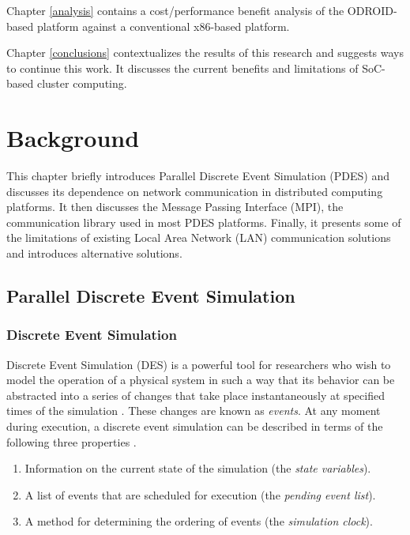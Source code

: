 \documentclass[11pt]{book}
\begin{document}
Chapter \ref{analysis} contains a cost/performance benefit analysis of the ODROID-based
platform against a conventional x86-based platform.  

Chapter \ref{conclusions} contextualizes the results of this research and suggests ways to
continue this work. It discusses the current benefits and limitations of SoC-based cluster
computing.

\chapter{Background}\label{background}

This chapter briefly introduces Parallel Discrete Event Simulation (PDES) and discusses
its dependence on network communication in distributed computing platforms.  It then
discusses the Message Passing Interface (MPI), the communication library used in most PDES
platforms.  Finally, it presents some of the limitations of existing Local Area Network
(LAN) communication solutions and introduces alternative solutions.

\section{Parallel Discrete Event Simulation}

\subsection{Discrete Event Simulation}

Discrete Event Simulation (DES) is a powerful tool for researchers who wish to model the
operation of a physical system in such a way that its behavior can be abstracted into a
series of changes that take place instantaneously at specified times of the simulation
\cite{jacob-13}.  These changes are known as \textit{events}. At any moment during
execution, a discrete event simulation can be described in terms of the following three
properties \cite{fujimoto-pdes,jacob-13,page-94}.

\begin{enumerate}
  \item Information on the current state of the simulation (the \textit{state variables}).
  \item A list of events that are scheduled for execution (the \textit{pending event
    list}).
  \item A method for determining the ordering of events (the \textit{simulation clock}).
\end{enumerate}
\end{document}
